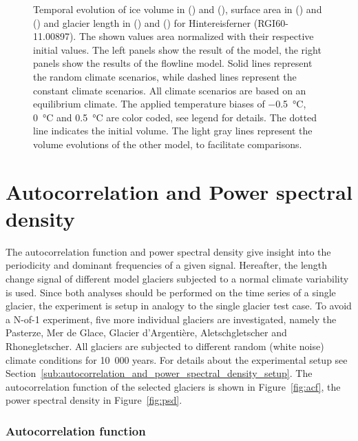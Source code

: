\begin{figure}[p]
      \caption{Temporal evolution of ice volume in () and (), surface area in () and () and glacier length in () and () for Hintereisferner (RGI60-11.00897). The shown values area normalized with their respective initial values. The left panels show the result of the \vas{} model, the right panels show the results of the flowline model. Solid lines represent the random climate scenarios, while dashed lines represent the constant climate scenarios. All climate scenarios are based on an equilibrium climate. The applied temperature biases of \SI{-.5}{\celsius}, \SI{0}{\celsius} and \SI{+.5}{\celsius} are color coded, see legend for details. The dotted line indicates the initial volume. The light gray lines represent the volume evolutions of the other model, to facilitate comparisons.}
      \label{fig:hintereisferner}
    \end{figure}



  \section{Autocorrelation and Power spectral density} %
  \label{sec:autocorrelation_and_power_spectral_density_results}
    
    The autocorrelation function and power spectral density give insight into the periodicity and dominant frequencies of a given signal. Hereafter, the length change signal of different model glaciers subjected to a normal climate variability is used. Since both analyses should be performed on the time series of a single glacier, the experiment is setup in analogy to the single glacier test case. To avoid a N-of-1 experiment, five more individual glaciers are investigated, namely the Pasterze, Mer de Glace, Glacier d'Argentière, Aletschgletscher and Rhonegletscher. All glaciers are subjected to different random (white noise) climate conditions for 10\ 000 years. For details about the experimental setup see Section~\ref{sub:autocorrelation_and_power_spectral_density_setup}. The autocorrelation function of the selected glaciers is shown in Figure~\ref{fig:acf}, the power spectral density in Figure~\ref{fig:psd}. 

    \subsubsection{Autocorrelation function} %
    \label{ssub:autocorrelation_function_results}

